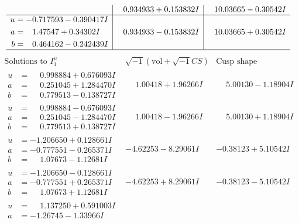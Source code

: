 \documentclass[1p]{elsarticle_modified}
\theoremstyle{definition}
\newcommand{\I}{\sqrt{-1}}
\begin{document}
$$\begin{array}{c|c|c}
 & \phantom{-}0.934933 + 0.153832 I & \phantom{-}10.03665 - 0.30542 I \\ \hline\begin{aligned}
u &= -0.717593 - 0.390417 I \\
a &= \phantom{-}1.47547 + 0.34302 I \\
b &= \phantom{-}0.464162 - 0.242439 I\end{aligned}
 & \phantom{-}0.934933 - 0.153832 I & \phantom{-}10.03665 + 0.30542 I\\
 \hline 
 \end{array}$$\newpage$$\begin{array}{c|c|c}  
\text{Solutions to }I^u_{1}& \I (\text{vol} + \sqrt{-1}CS) & \text{Cusp shape}\\
 \hline 
\begin{aligned}
u &= \phantom{-}0.998884 + 0.676093 I \\
a &= \phantom{-}0.251045 + 1.284470 I \\
b &= \phantom{-}0.779513 - 0.138727 I\end{aligned}
 & \phantom{-}1.00418 + 1.96266 I & \phantom{-}5.00130 - 1.18904 I \\ \hline\begin{aligned}
u &= \phantom{-}0.998884 - 0.676093 I \\
a &= \phantom{-}0.251045 - 1.284470 I \\
b &= \phantom{-}0.779513 + 0.138727 I\end{aligned}
 & \phantom{-}1.00418 - 1.96266 I & \phantom{-}5.00130 + 1.18904 I \\ \hline\begin{aligned}
u &= -1.206650 + 0.128661 I \\
a &= -0.777551 - 0.265371 I \\
b &= \phantom{-}1.07673 - 1.12681 I\end{aligned}
 & -4.62253 - 8.29061 I & -0.38123 + 5.10542 I \\ \hline\begin{aligned}
u &= -1.206650 - 0.128661 I \\
a &= -0.777551 + 0.265371 I \\
b &= \phantom{-}1.07673 + 1.12681 I\end{aligned}
 & -4.62253 + 8.29061 I & -0.38123 - 5.10542 I \\ \hline\begin{aligned}
u &= \phantom{-}1.137250 + 0.591003 I \\
a &= -1.26745 - 1.33966 I \\

\end{aligned}
\end{array}$$
\end{document}
